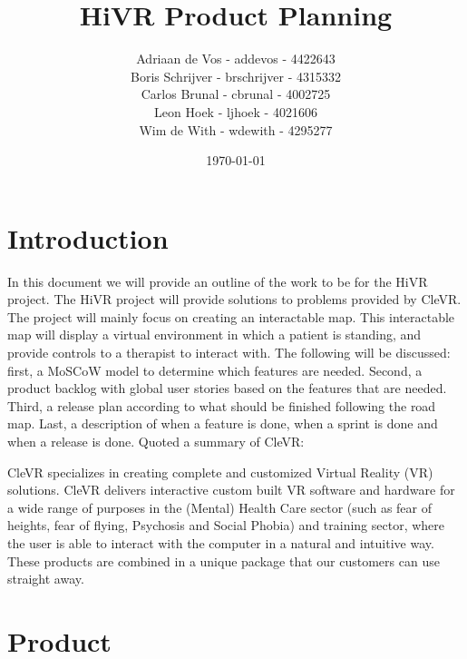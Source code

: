 \documentclass[11pt]{article}
\begin{document}
\title{HiVR Product Planning}
\author{
	Adriaan de Vos - addevos - 4422643\\
	Boris Schrijver - brschrijver - 4315332\\
	Carlos Brunal - cbrunal - 4002725\\
	Leon Hoek - ljhoek - 4021606\\
	Wim de With - wdewith - 4295277
}
\date{\today}

\maketitle

\newpage
\tableofcontents
\newpage

\section{Introduction}
In this document we will provide an outline of the work to be for the HiVR project. The HiVR project will provide solutions to problems provided by \gls{CleVR}. The project will mainly focus on creating an interactable map. This interactable map will display a virtual environment in which a patient is standing, and provide controls to a therapist to interact with. The following will be discussed: first, a MoSCoW model to determine which features are needed. Second, a product backlog with global user stories based on the features that are needed. Third, a release plan according to what should be finished following the road map. Last, a description of when a feature is done, when a sprint is done and when a release is done.
\newline
\newline
Quoted a summary of \gls{CleVR}:
\begin{displayquote}
CleVR specializes in creating complete and customized Virtual Reality (VR) solutions. CleVR delivers interactive custom built VR software and hardware for a wide range of purposes in the (Mental) Health Care sector (such as fear of heights, fear of flying, Psychosis and Social Phobia) and training sector, where the user is able to interact with the computer in a natural and intuitive way. These products are combined in a unique package that our customers can use straight away.
\end{displayquote}

\section{Product}
\end{document}
